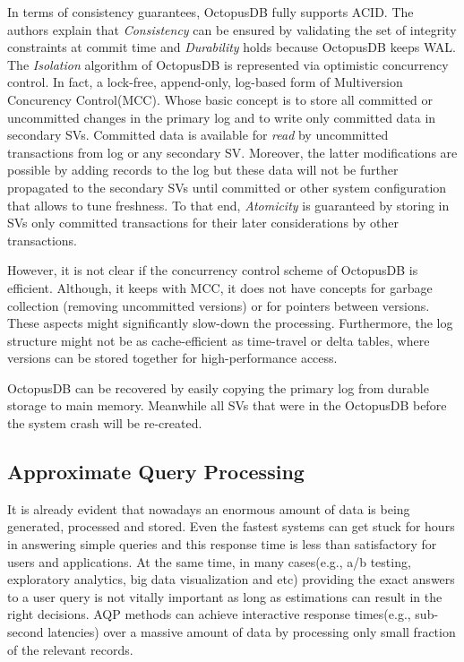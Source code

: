 \documentclass[10pt, conference, compsocconf]{IEEEtran}
\begin{document}
In terms of consistency guarantees, OctopusDB fully supports ACID. The authors explain that \textit{Consistency} can be ensured by validating the set of integrity constraints at commit time and \textit{Durability} holds because OctopusDB keeps WAL. The \textit{Isolation} algorithm of OctopusDB is represented via optimistic concurrency control. In fact, a lock-free, append-only, log-based form of Multiversion Concurency Control(MCC). Whose basic concept is to store all committed or uncommitted changes in the primary log and to write only committed data in secondary SVs. Committed data is available for \textit{read} by uncommitted transactions from log or any secondary SV. Moreover, the latter modifications are possible by adding records to the log but these data will not be further propagated to the secondary SVs until committed or other system configuration that allows to tune freshness. To that end, \textit{Atomicity} is guaranteed by storing in SVs only committed transactions for their later considerations by other transactions.

However, it is not clear if the concurrency control scheme of OctopusDB is efficient. Although, it keeps with MCC, it does not have concepts for garbage collection (removing uncommitted versions) or for pointers between versions. These aspects might significantly slow-down the processing. Furthermore, the log structure might not be as cache-efficient as time-travel or delta tables, where versions can be stored together for high-performance access.

OctopusDB can be recovered by easily copying the primary log from durable storage to main memory. Meanwhile all SVs that were in the OctopusDB before the system crash will be re-created.

\subsection{Approximate Query Processing}

It is already evident that nowadays an enormous amount of data is being generated, processed and stored. Even the fastest systems can get stuck for hours in answering simple queries and this response time is less than satisfactory for users and applications. At the same time, in many cases(e.g., a/b testing, exploratory analytics, big data visualization and etc) providing the exact answers to a user query is not vitally important as long as estimations can result in the right decisions. AQP methods can achieve interactive response times(e.g., sub-second latencies) over a massive amount of data by processing only small fraction of the relevant records. 
\end{document}

